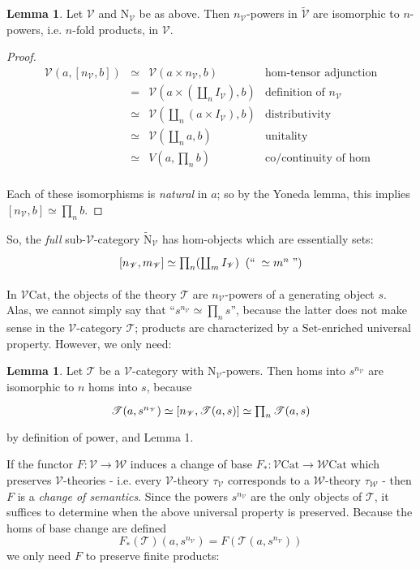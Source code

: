 \documentclass[a4paper,UKenglish]{article}
\theoremstyle{definition}
\newtheorem{lemma}[theorem]{Lemma}
\newcommand{\Set}{\mathrm{Set}}
\newcommand{\Cat}{\mathrm{Cat}}
\newcommand{\NN}{\mathrm{N}}
\newcommand{\V}{\mathscr{V}}
\newcommand{\W}{\mathscr{W}}
\newcommand{\T}{\mathscr{T}}
\begin{document}
\begin{lemma}
	Let $\V$ and $\NN_\V$ be as above. Then $n_\V$-powers in $\tilde{\V}$ are isomorphic to $n$-powers, i.e. $n$-fold products, in $\V$.
\end{lemma}
\begin{proof}
	\[\begin{array}{rcll}
	\V(a,[n_\V,b]) & \simeq & \V(a\times n_\V,b) & \text{hom-tensor adjunction}\\
	& = & \V(a\times (\coprod_n I_\V),b) & \text{definition of } n_\V\\
	& \simeq & \V(\coprod_n(a\times I_\V),b) & \text{distributivity}\\
	& \simeq & \V(\coprod_n a,b) & \text{unitality}\\
	& \simeq & V(a,\prod_n b) & \text{co/continuity of hom}\\
	\end{array}\]

Each of these isomorphisms is \textit{natural} in $a$; so by the Yoneda lemma, this implies $[n_\V,b] \simeq \prod_n b$.
\end{proof}

So, the \textit{full} sub-$\V$-category $\tilde{\NN}_\V$ has hom-objects which are essentially sets:
\[\begin{tikzcd}
\left[n_\V,m_\V\right] \simeq \prod_n (\coprod_m I_\V) \;\; (`` \; \simeq m^n \;")
\end{tikzcd}\]

In $\V\Cat$, the objects of the theory $\T$ are $n_\V$-powers of a generating object $s$. Alas, we cannot simply say that ``$s^{n_\V} \simeq \prod_n s$'', because the latter does not make sense in the $\V$-category $\T$; products are characterized by a $\Set$-enriched universal property. However, we only need:

\begin{lemma}
	Let $\T$ be a $\V$-category with $\NN_\V$-powers. Then homs into $s^{n_\V}$ are isomorphic to $n$ homs into $s$, because \[\begin{tikzcd} \T(a,s^{n_\V}) \simeq [n_\V,\T(a,s)] \simeq \prod_n \T(a,s) \end{tikzcd}\] by definition of power, and Lemma 1.
\end{lemma}

If the functor $F:\V \to \W$ induces a change of base $F_*:\V\Cat \to \W\Cat$ which preserves $\V$-theories - i.e. every $\V$-theory $\tau_\V$ corresponds to a $\W$-theory $\tau_\W$ - then $F$ is a \textit{change of semantics}. Since the powers $s^{n_\V}$ are the only objects of $\T$, it suffices to determine when the above universal property is preserved. Because the homs of base change are defined $$F_*(\T)(a,s^{n_\V}) = F(\T(a,s^{n_\V}))$$ we only need $F$ to preserve finite products:
\end{document}
